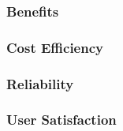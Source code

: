 \documentclass[12pt,a4paper]{article}
\begin{document}
\subsubsection*{Benefits}
\bitm
\item 
\eitm

\subsubsection*{Cost Efficiency}
\bitm
\item 
\eitm

\subsubsection*{Reliability}
\bitm
\item 
\eitm

\subsubsection*{User Satisfaction}
\bitm
\item 
\eitm
\newpage
{}

\end{document}
